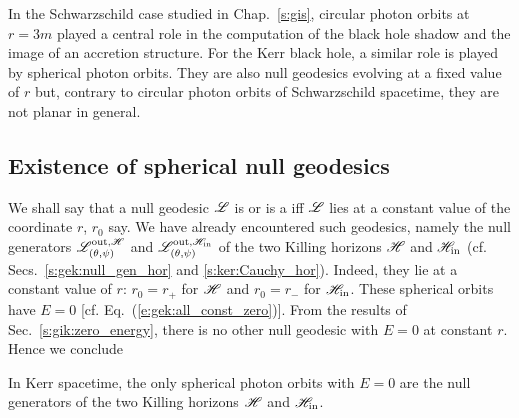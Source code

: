 In the Schwarzschild case studied in Chap.~\ref{s:gis}, circular photon
orbits at $r=3m$ played a central role in the computation of
the black hole shadow and the image of an accretion structure.
For the Kerr black hole, a similar role is played by spherical photon
orbits. They are also null geodesics evolving at a fixed value of $r$ but, contrary
to circular photon orbits of Schwarzschild spacetime, they are not planar
in general.


\subsection{Existence of spherical null geodesics} \label{s:gik:spher_existence}

We shall say that a null geodesic $\mathscr{L}$ is  or
is a  iff $\mathscr{L}$ lies at a constant value of the coordinate $r$, $r_0$ say.
We have already encountered such geodesics, namely the null generators
$\mathscr{L}^{{\rm out},\mathscr{H}}_{(\theta,\psi)}$ and $\mathscr{L}^{{\rm out},\mathscr{H}_{\rm in}}_{(\theta,\psi)}$
of the two Killing horizons
$\mathscr{H}$ and $\mathscr{H}_{\rm in}$ (cf. Secs.~\ref{s:gek:null_gen_hor} and \ref{s:ker:Cauchy_hor}).
Indeed, they lie at a constant value of $r$: $r_0 = r_+$ for
$\mathscr{H}$ and $r_0 = r_-$ for $\mathscr{H}_{\rm in}$.  These spherical orbits have $E=0$
[cf. Eq.~(\ref{e:gek:all_const_zero})].
From the results of Sec.~\ref{s:gik:zero_energy}, there is no other null geodesic with $E=0$ at constant $r$.
Hence we conclude
\begin{greybox}
In Kerr spacetime, the only spherical photon orbits with $E=0$ are the null generators of the two Killing horizons $\mathscr{H}$ and $\mathscr{H}_{\rm in}$.
\end{greybox}

